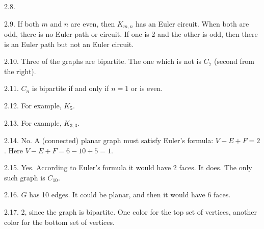 \begin{itemize}
\begin{ans}{2.8.}
\end{ans}
\begin{ans}{2.9.}
		If both $m$ and $n$ are even, then $K_{m,n}$ has an Euler circuit.  When both are odd, there is no Euler path or circuit.  If one is 2 and the other is odd, then there is an Euler path but not an Euler circuit. %
	
\end{ans}
\begin{ans}{2.10.}
		Three of the graphs are bipartite.  The one which is not is $C_7$ (second from the right).
	
\end{ans}
\begin{ans}{2.11.}
		$C_n$ is bipartite if and only if $n = 1$ or is even.
	
\end{ans}
\begin{ans}{2.12.}
		For example, $K_5$.
	
\end{ans}
\begin{ans}{2.13.}
		For example, $K_{3,3}$.
	
\end{ans}
\begin{ans}{2.14.}
		No.  A (connected) planar graph must satisfy Euler's formula: $V - E + F = 2$.  Here $V - E + F = 6 - 10 + 5 = 1$. %
	
\end{ans}
\begin{ans}{2.15.}
		Yes.  According to Euler's formula it would have 2 faces.  It does.  The only such graph is $C_{10}$. %
	
\end{ans}
\begin{ans}{2.16.}
		$G$ has 10 edges.  It could be planar, and then it would have 6 faces. %
	
\end{ans}
\begin{ans}{2.17.}
		2, since the graph is bipartite.  One color for the top set of vertices, another color for the bottom set of vertices.  %
	

\end{ans}
\end{itemize}
